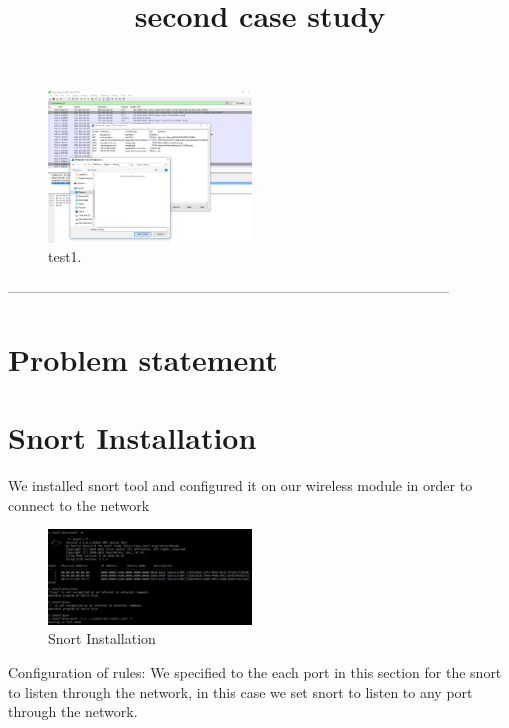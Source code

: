 \documentclass{article}
\begin{document}
\begin{figure}[H]
	\begin{center}
		\includegraphics[width=0.48\textwidth]{FILECARVING2.png}
	\end{center}
	\caption{test1.}
	\label{fig:Prd}
\end{figure}
-----------------------------------------------------------------------------------------------

\title {second case study}


\section{Problem statement}


\section{Snort Installation}
We installed snort tool and configured it on our wireless module in order to connect to the network


\begin{figure}[H]
	\begin{center}
		\includegraphics[width=0.48\textwidth]{SnortIns.jpg}
	\end{center}
	\caption{Snort Installation}
	\label{fig:SnortIns}
\end{figure}


Configuration of rules:
We specified to the each port in this section for the snort to listen through the network, in this case we set snort to listen to any port through the network.
\end{document}
